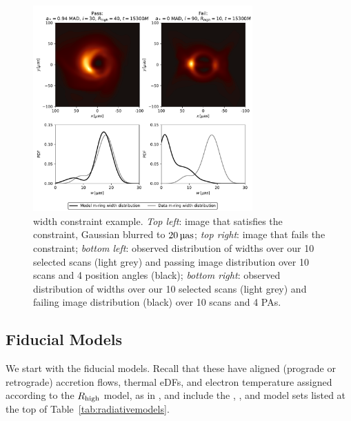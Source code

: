 \begin{figure}
  \centering
  \includegraphics[width=0.75\textwidth]{figures/mring_width_example.pdf}
  \caption{\Mring width constraint example.
    \emph{Top left}: image that satisfies the constraint, Gaussian blurred to $20\uas$;
    \emph{top right}: image that fails the constraint;
    \emph{bottom left}: observed distribution of \mring widths over our 10 selected scans (light grey) and passing image distribution over 10 scans and 4 position angles (black);
    \emph{bottom right}: observed distribution of \mring widths over our 10 selected scans (light grey) and failing image distribution (black) over 10 scans and 4 PAs.}
  \label{fig:mring_width_example}
\end{figure}


\subsection{Fiducial Models}\label{subsec:thermal}

We start with the fiducial models.
Recall that these have aligned (prograde or retrograde) accretion flows, thermal eDFs, and electron temperature assigned according to the $R_\mathrm{high}$ model, as in , and include the  \kharma, \bhac, and \hamr model sets listed at the top of Table~\ref{tab:radiativemodels}.

